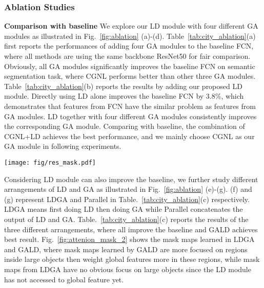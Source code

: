 \documentclass{bmvc2k}
\begin{document}
\subsubsection{Ablation Studies }
\label{sec:ablation}
\textbf{Comparison with baseline} 
We explore our LD module with four different GA modules as illustrated in Fig.~\ref{fig:ablation} (a)-(d).
Table~\ref{tab:city_ablation}(a) first reports the performances of adding four GA modules to the baseline FCN, where all methods are using the same backbone ResNet50 for fair comparison.  Obviously, all GA modules significantly improves the baseline FCN on semantic segmentation task, where CGNL performs better than other three GA modules.
Table~\ref{tab:city_ablation}(b) reports the results by adding our proposed LD module. Directly using LD alone improves the baseline FCN by 3.8\%, which demonstrates that features from FCN have the similar problem as features from GA modules. LD together with four different GA modules consistently improves the corresponding GA module. Comparing with baseline, the combination of CGNL+LD achieves the best performance, and we mainly choose CGNL as our GA module in following experiments.



\begin{figure*}
	\centering
	\texttt{[image: fig/res\_mask.pdf]}
	\caption{
	    Comparison of mask maps learned in different arrangements of GA and LD. The mask maps are calculated by the mean of $\textbf{M}$ along channel dimension.
		Best view in color.}
	\label{fig:attenion_mask_2}
\end{figure*}

 Considering LD module can also improve the baseline, we further study different arrangements of LD and GA as illustrated in Fig.~\ref{fig:ablation} (e)-(g). (f) and (g) represent LDGA and Parallel in Table.~\ref{tab:city_ablation}(c) respectively. LDGA means first doing LD then doing GA while Parallel concatenates the output of LD and GA.
Table.~\ref{tab:city_ablation}(c) reports the results of the three different arrangements, where all improve the baseline and GALD achieves best result. Fig.~\ref{fig:attenion_mask_2} shows the mask maps learned in LDGA and GALD, where mask maps
learned by GALD are more focused on regions inside large objects then weight global features more in these regions, while mask maps from LDGA have no obvious focus on large objects since the LD module has not accessed to global feature yet.
\end{document}

